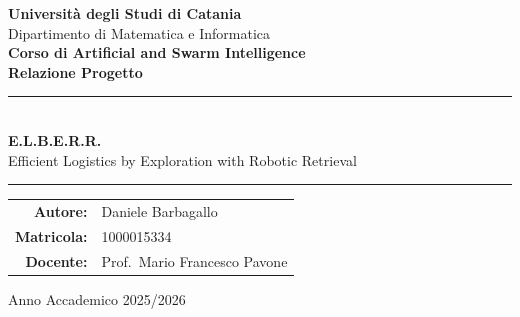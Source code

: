 \begin{titlepage}
\centering

\vspace*{1.5cm}

{\Huge \textbf{Università degli Studi di Catania}}\\[0.5cm]
{\large Dipartimento di Matematica e Informatica}\\[2cm]

{\Large \textbf{Corso di Artificial and Swarm Intelligence}}\\[0.4cm]
{\large \textbf{Relazione Progetto}}\\[2.5cm]

\rule{\textwidth}{1.2pt}\\[0.6cm]
{\Huge\bfseries E.L.B.E.R.R.}\\[0.3cm]
{\Large Efficient Logistics by Exploration with Robotic Retrieval}\\[0.6cm]
\rule{\textwidth}{1.2pt}

\vspace{5.5cm}
\begin{flushright}
\begin{tabular}{@{}rl@{}}
\textbf{Autore:}          & Daniele Barbagallo\\[0.2cm]
\textbf{Matricola:}       & 1000015334\\[0.5cm]
\textbf{Docente:}         & Prof.\ Mario Francesco Pavone\\[0.15cm]
\end{tabular}
\end{flushright}

\vspace{1cm}

\begin{center}
{Anno Accademico 2025/2026}
\end{center}

\end{titlepage}

\clearpage
